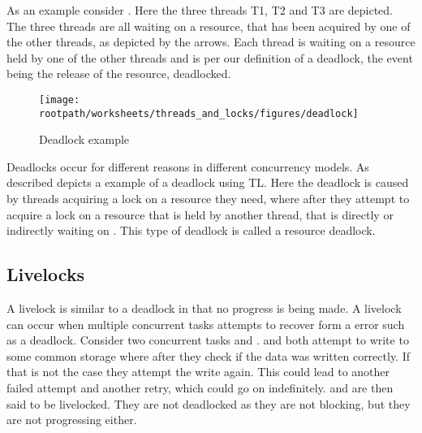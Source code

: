 As an example consider . Here the three threads T1, T2 and T3 are depicted. The three threads are all waiting on a resource, that has been acquired by one of the other threads, as depicted by the arrows. Each thread is waiting on a resource held by one of the other threads and is per our definition of a deadlock, the event being the release of the resource, deadlocked.
\begin{figure}[htbp]
\centering
 \texttt{[image: \\rootpath/worksheets/threads\_and\_locks/figures/deadlock]} 
 \caption{Deadlock example}
\label{fig:deadlockexample}
\end{figure}

Deadlocks occur for different reasons in different concurrency models. As described  depicts a example of a deadlock using \ac{TL}. Here the deadlock is caused by threads acquiring a lock on a resource they need, where after they attempt to acquire a lock on a resource that is held by another thread, that is directly or indirectly waiting on . This type of deadlock is called a resource deadlock\cite[p. 435]{tanenbaum2008modern}. 


\subsection{Livelocks} A livelock is similar to a deadlock in that no progress is being made. A livelock can occur when multiple concurrent tasks attempts to recover form a error such as a deadlock\cite[p. 457]{tanenbaum2008modern}. Consider two concurrent tasks  and .  and  both attempt to write to some common storage where after they check if the data was written correctly. If that is not the case they attempt the write again. This could lead to another failed attempt and another retry, which could go on indefinitely.  and  are then said to be livelocked. They are not deadlocked as they are not blocking, but they are not progressing either. 

